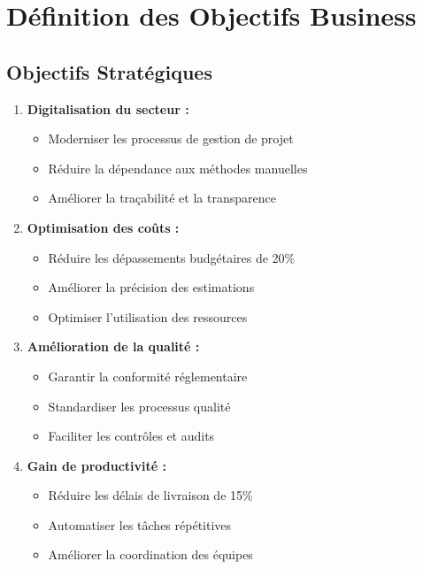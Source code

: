 \documentclass[12pt, a4paper]{report}
\begin{document}
\section{Définition des Objectifs Business}

\subsection{Objectifs Stratégiques}

\begin{enumerate}
    \item \textbf{Digitalisation du secteur :}
    \begin{itemize}
        \item Moderniser les processus de gestion de projet
        \item Réduire la dépendance aux méthodes manuelles
        \item Améliorer la traçabilité et la transparence
    \end{itemize}
    
    \item \textbf{Optimisation des coûts :}
    \begin{itemize}
        \item Réduire les dépassements budgétaires de 20\%
        \item Améliorer la précision des estimations
        \item Optimiser l'utilisation des ressources
    \end{itemize}
    
    \item \textbf{Amélioration de la qualité :}
    \begin{itemize}
        \item Garantir la conformité réglementaire
        \item Standardiser les processus qualité
        \item Faciliter les contrôles et audits
    \end{itemize}
    
    \item \textbf{Gain de productivité :}
    \begin{itemize}
        \item Réduire les délais de livraison de 15\%
        \item Automatiser les tâches répétitives
        \item Améliorer la coordination des équipes
    \end{itemize}
\end{enumerate}
\end{document}
